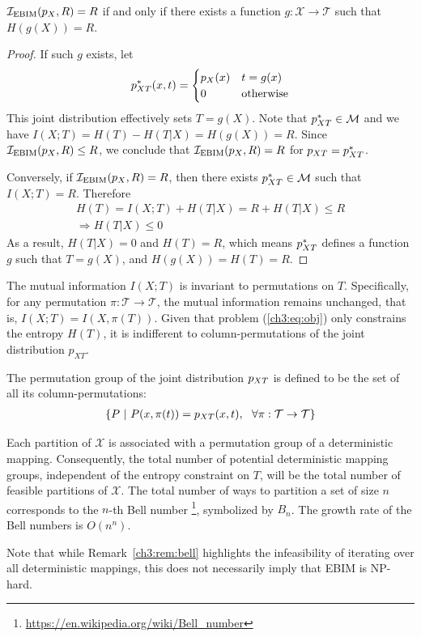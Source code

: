 \begin{theorem}\label{ch3:thm:funcMapping}
    $\mathcal{I}_\text{EBIM}(p_X, R) = R$ if and only if there exists a function $g: \mathcal{X} \to \mathcal{T}$ such that $H(g(X))=R$.
\end{theorem}
\begin{proof}
    If such $g$ exists, let
    \[
    p_{XT}^*(x, t) = 
    \begin{cases}
        p_X(x) & t = g(x) \\
        0   & \text{otherwise}
    \end{cases}
    \]
    This joint distribution effectively sets $T=g(X)$. Note that $p_{XT}^*\in\mathcal{M}$ and we have $I(X;T)=H(T)-H(T|X)=H(g(X))=R$. Since $\mathcal{I}_\text{EBIM}(p_X, R)\leq R$, we conclude that $\mathcal{I}_\text{EBIM}(p_X, R) = R$ for $p_{XT} = p_{XT}^*$.

    Conversely, if $\mathcal{I}_\text{EBIM}(p_X, R) = R$, then there exists $p_{XT}^*\in\mathcal{M}$ such that $I(X;T)=R$. Therefore
    \begin{gather*}
        H(T) 
        = I(X;T) + H(T|X) 
        = R + H(T|X) 
        \leq R \\
        \Rightarrow H(T|X) \leq 0
    \end{gather*}
    As a result, $H(T|X)=0$ and $H(T)=R$, which means $p_{XT}^*$ defines a function $g$ such that $T=g(X)$, and $H(g(X))=H(T)=R$. 
\end{proof}

\begin{remark}
    The mutual information $I(X;T)$ is invariant to permutations on $T$. Specifically, for any permutation $\pi: \mathcal{T} \to \mathcal{T}$, the mutual information remains unchanged, that is, $I(X;T) = I(X, \pi(T))$. Given that problem (\ref{ch3:eq:obj}) only constrains the entropy $H(T)$, it is indifferent to column-permutations of the joint distribution $p_{XT}$.
\end{remark}

\begin{definition}
    The permutation group of the joint distribution $p_{XT}$ is defined to be the set of all its column-permutations:
    \begin{align}
        \left\{P \ | \ P(x, \pi(t)) = p_{XT}(x, t), \ \ \forall \pi:\mathcal{T}\to\mathcal{T} \right\}
    \end{align}
\end{definition}

\begin{remark}\label{ch3:rem:bell}  
    Each partition of $\mathcal{X}$ is associated with a permutation group of a deterministic mapping. Consequently, the total number of potential deterministic mapping groups, independent of the entropy constraint on $T$, will be the total number of feasible partitions of $\mathcal{X}$.
    The total number of ways to partition a set of size $n$ corresponds to the $n$-th Bell number \footnote{\url{https://en.wikipedia.org/wiki/Bell_number}}, symbolized by $B_n$. The growth rate of the Bell numbers is $O(n^n)$.
\end{remark}
Note that while Remark~\ref{ch3:rem:bell} highlights the infeasibility of iterating over all deterministic mappings, this does not necessarily imply that EBIM is NP-hard.


